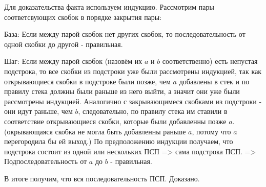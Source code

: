 Для доказательства факта используем индукцию.
Рассмотрим пары соответсвующих скобок в порядке закрытия пары:

База: Если между парой скобок нет других скобок, то последовательность от одной скобки до другой - правильная.

Шаг: Если между парой скобок (назовём их $a$ и $b$ соответственно) есть непустая подстрока, то все скобки из подстроки уже были рассмотрены индукцией, так как открывающиеся скобки в подстроке были позже, чем $a$ добавлены в стек и по правилу стека должны были раньше из него выйти, а значит они уже были рассмотрены индукцией. Аналогично с закрывающимеся скобками из подстроки - они идут раньше, чем $b$, следовательно, по правилу стека им ставили в соответствие открывающиеся скобки, которые были добавленны позже $a$. (окрывающаяся скобка не могла быть добавленны раньше $a$, потому что $a$ перегородила бы ей выход.) По предположению индукции получаем, что подстрока состоит из одной или нескольких ПСП => сама подстрока ПСП. => Подпоследовательность от $a$ до $b$ - правильная. 

В итоге получим, что вся последовательность ПСП. Доказано.